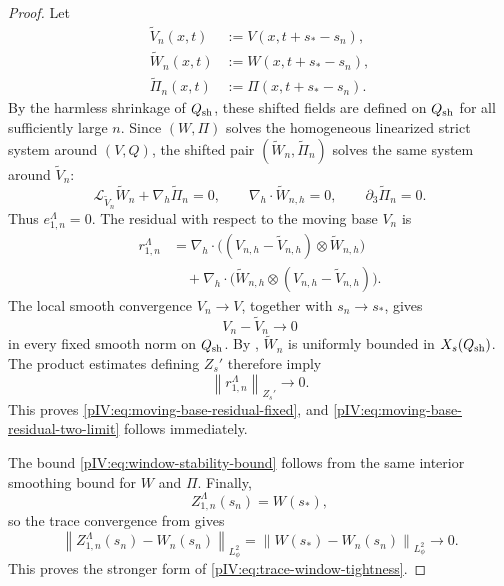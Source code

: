 \documentclass[11pt]{article}
\numberwithin{equation}{section}
\theoremstyle{plain}
\theoremstyle{definition}
\theoremstyle{remark}
\newcommand{\nabh}{\nabla_h}
\newcommand{\divh}{\nabla_h\!\cdot}
\newcommand{\norm}[2]{\left\|#1\right\|_{#2}}
\begin{document}
\begin{proof}
Let
\[
\begin{aligned}
        \widetilde V_n(x,t)&:=V(x,t+s_*-s_n),\\
        \widetilde W_n(x,t)&:=W(x,t+s_*-s_n),\\
        \widetilde\Pi_n(x,t)&:=\Pi(x,t+s_*-s_n).
\end{aligned}
\]
By the harmless shrinkage of \(Q_{\rm sh}\), these shifted fields are defined on
\(Q_{\rm sh}\) for all sufficiently large \(n\).  Since \((W,\Pi)\) solves the
homogeneous linearized strict system around \((V,Q)\), the shifted pair
\((\widetilde W_n,\widetilde\Pi_n)\) solves the same system around
\(\widetilde V_n\):
\[
        {\mathcal L}_{\widetilde V_n}\widetilde W_n+\nabh\widetilde\Pi_n=0,
        \qquad
        \divh\widetilde W_{n,h}=0,
        \qquad
        \partial_3\widetilde\Pi_n=0 .
\]
Thus \(e_{1,n}^\Lambda=0\).  The residual with respect to the moving base \(V_n\) is
\[
\begin{aligned}
        r_{1,n}^\Lambda
        &=\nabh\cdot\Big((V_{n,h}-\widetilde V_{n,h})\otimes
        \widetilde W_{n,h}\Big)\\
        &\quad+
        \nabh\cdot\Big(\widetilde W_{n,h}\otimes
        (V_{n,h}-\widetilde V_{n,h})\Big).
\end{aligned}
\]
The local smooth convergence \(V_n\to V\), together with \(s_n\to s_*\), gives
\[
        V_n-\widetilde V_n\to0
\]
in every fixed smooth norm on \(Q_{\rm sh}\).  By
, \(\widetilde W_n\) is uniformly bounded in
\(X_s(Q_{\rm sh})\).  The product estimates defining \(Z_s'\) therefore imply
\[
        \norm{r_{1,n}^\Lambda}{Z_s'}\to0.
\]
This proves \eqref{pIV:eq:moving-base-residual-fixed}, and
\eqref{pIV:eq:moving-base-residual-two-limit} follows immediately.

The bound \eqref{pIV:eq:window-stability-bound} follows from the same interior smoothing
bound for \(W\) and \(\Pi\).  Finally,
\[
        Z_{1,n}^\Lambda(s_n)=W(s_*),
\]
so the trace convergence from  gives
\[
        \norm{Z_{1,n}^\Lambda(s_n)-W_n(s_n)}{L^2_\phi}
        =
        \norm{W(s_*)-W_n(s_n)}{L^2_\phi}
        \to0 .
\]
This proves the stronger form of \eqref{pIV:eq:trace-window-tightness}.
\end{proof}
\end{document}
